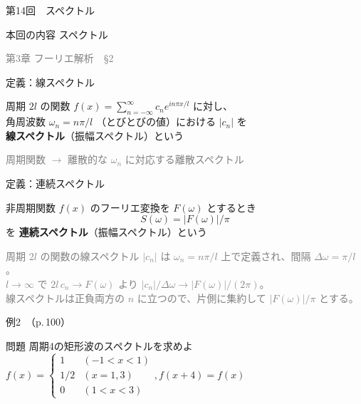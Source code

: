 \documentclass[professionalfonts]{beamer}
\begin{document}
\begin{frame}{第14回　スペクトル}
  \begin{block}{本回の内容}
  スペクトル
  \end{block}
  \vfill\hfill{\scriptsize \textcolor{gray}{第3章 フーリエ解析　§2}}
\end{frame}

\begin{frame}{定義：線スペクトル}
  \begin{block}{}
  周期 $2l$ の関数 $f(x) = \sum_{n=-\infty}^\infty c_{n} e^{in\pi x/l}$ に対し、\\[4pt]
  角周波数 $\omega_{n} = n\pi/l$ （とびとびの値）における $|c_{n}|$ を\\[4pt]
  \textbf{線スペクトル}（振幅スペクトル）という
  \end{block}
  {\footnotesize \textcolor{gray}{周期関数 $\to$ 離散的な $\omega_{n}$ に対応する離散スペクトル}}
\end{frame}

\begin{frame}{定義：連続スペクトル}
  \begin{block}{}
  非周期関数 $f(x)$ のフーリエ変換を $F(\omega)$ とするとき\\[4pt]
  \[
    S(\omega) = |F(\omega)| / \pi
  \]
  を \textbf{連続スペクトル}（振幅スペクトル）という
  \end{block}
  {\footnotesize \textcolor{gray}{周期 $2l$ の関数の線スペクトル $|c_{n}|$ は $\omega_{n}=n\pi/l$ 上で定義され、間隔 $\Delta\omega = \pi/l$。}\\
  \textcolor{gray}{$l\to\infty$ で $2l\, c_{n} \to F(\omega)$ より $|c_{n}|/\Delta\omega \to |F(\omega)|/(2\pi)$。}\\
  \textcolor{gray}{線スペクトルは正負両方の $n$ に立つので、片側に集約して $|F(\omega)|/\pi$ とする。}}
\end{frame}

\begin{frame}{例2　（p.\,100）}
  \begin{exampleblock}{問題}
    周期4の矩形波のスペクトルを求めよ\\[2pt]
    $f(x) = \begin{cases} 1 & (-1 < x < 1) \\ 1/2 & (x = 1, 3) \\ 0 & (1 < x < 3) \end{cases},  f(x+4) = f(x)$\\[2pt]
  \end{exampleblock}
\end{frame}
\end{document}
